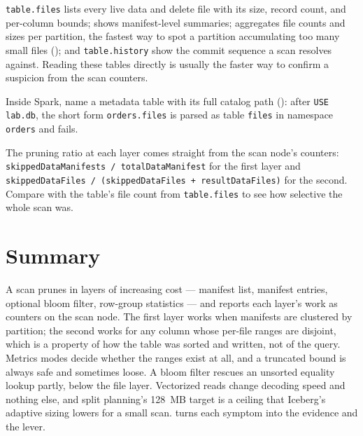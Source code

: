 \texttt{table.files} lists every live data and delete file with its size, record
count, and per-column bounds;  shows manifest-level
summaries;  aggregates file counts and sizes per
partition, the fastest way to spot a partition accumulating too many small files
();  and \texttt{table.history}
show the commit sequence a scan resolves against. Reading these tables directly
is usually the faster way to confirm a suspicion from the scan counters.

Inside Spark, name a metadata table with its full catalog path
(): after \texttt{USE lab.db}, the short form
\texttt{orders.files} is parsed as table \texttt{files} in namespace
\texttt{orders} and fails.

\begin{tip}
The pruning ratio at each layer comes straight from the scan node's counters:
\texttt{skippedDataManifests / totalDataManifest} for the first layer and
\texttt{skippedDataFiles / (skippedDataFiles + resultDataFiles)} for the second.
Compare  with the table's file count from
\texttt{table.files} to see how selective the whole scan was.
\end{tip}

\section{Summary}
\label{sec:ice-read-summary}

A scan prunes in layers of increasing cost --- manifest list, manifest entries,
optional bloom filter, row-group statistics --- and reports each layer's work as
counters on the scan node. The first layer works when manifests are clustered by
partition; the second works for any column whose per-file ranges are disjoint,
which is a property of how the table was sorted and written, not of the query.
Metrics modes decide whether the ranges exist at all, and a truncated bound is
always safe and sometimes loose. A bloom filter rescues an unsorted equality
lookup partly, below the file layer. Vectorized reads change decoding speed and
nothing else, and split planning's 128~MB target is a ceiling that Iceberg's
adaptive sizing lowers for a small scan.  turns each
symptom into the evidence and the lever.

